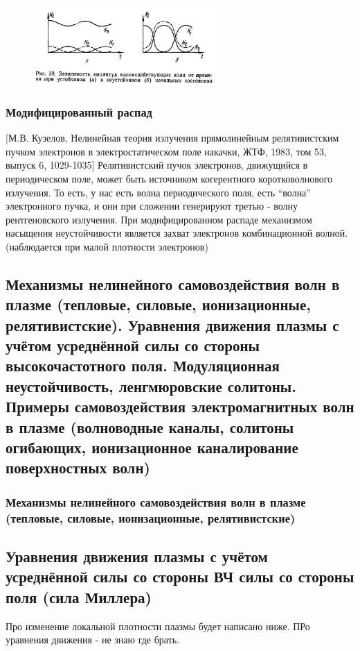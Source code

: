 \documentclass[10pt, a4paper]{article}
\begin{document}
\begin{figure}[ht]
	\begin{center}
		\includegraphics[width=70mm]{Wavetrans2.JPG}
	\end{center}
\end{figure}

\subsubsection{Модифицированный распад}
[М.В. Кузелов, Нелинейная теория излучения прямолинейным релятивистским пучком электронов в электростатическом поле накачки, ЖТФ, 1983, том 53, выпуск 6, 1029-1035]
Релятивистский пучок электронов, движущийся в периодическом поле, может быть источником когерентного коротковолнового излучения.
То есть, у нас есть волна периодического поля, есть “волна” электронного пучка, и они при сложении генерируют третью - волну рентгеновского излучения. 
При  модифицированном распаде механизмом насыщения неустойчивости является захват электронов комбинационной волной.(наблюдается при малой плотности электронов)




\subsection{Механизмы нелинейного самовоздействия волн в плазме (тепловые, силовые, ионизационные, релятивистские). Уравнения движения плазмы с учётом усреднённой силы со стороны высокочастотного поля. Модуляционная неустойчивость, ленгмюровские солитоны. Примеры самовоздействия электромагнитных волн в плазме (волноводные каналы, солитоны огибающих, ионизационное каналирование поверхностных волн)}


\subsubsection{Механизмы нелинейного самовоздействия волн в плазме (тепловые, силовые, ионизационные, релятивистские)}

\subsection{Уравнения движения плазмы с учётом усреднённой силы со стороны ВЧ силы со стороны поля (сила Миллера)}
Про изменение локальной плотности плазмы будет написано ниже. ПРо уравнения движения - не знаю где брать.
\end{document}
